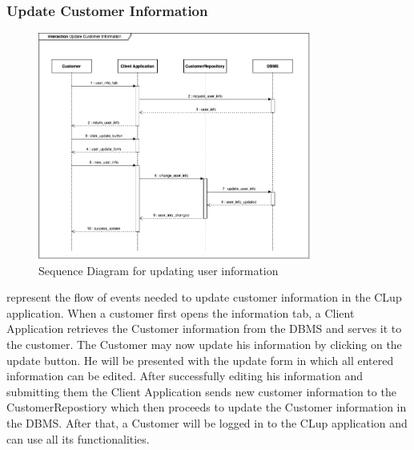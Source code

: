 \subsubsection{Update Customer Information}
\begin{figure}[H]
    \centering
    \includegraphics[width=0.8\textwidth]{Images/SequenceDiagrams/UpdateCustomerInformation.png}
    \caption{Sequence Diagram for updating user information}
    \label{fig:SDUpdateCustomerInformation}
\end{figure}
 represent the flow of events needed to update customer information in the CLup application.
When a customer first opens the information tab, a Client Application retrieves the Customer information from the DBMS and serves it to the customer.
The Customer may now update his information by clicking on the update button. He will be presented with the update form in which all entered information can be edited.
After successfully editing his information and submitting them the Client Application sends new customer information to the CustomerRepostiory which then proceeds to update the Customer information in the DBMS.
After that, a Customer will be logged in to the CLup application and can use all its functionalities.


